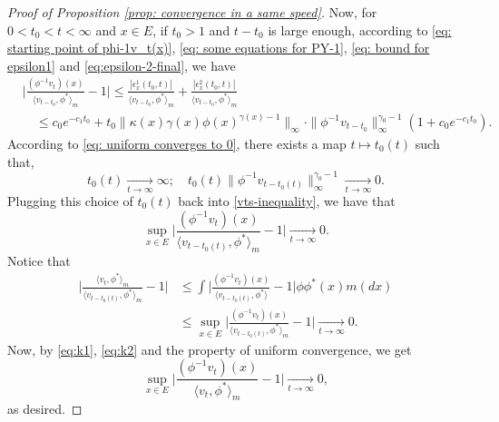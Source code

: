 \documentclass[12pt, a4paper]{amsart}
\theoremstyle{definition}
\numberwithin{equation}{section}
\begin{document}
\begin{proof}[Proof of Proposition \ref{prop: convergence in a same speed}]
Now, for
$0<t_0<t<\infty$ and $x\in E$, if $t_0 > 1$ and $t-t_0$ is large enough,
	according to \eqref{eq: starting point of phi-1v_t(x)}, \eqref{eq: some equations for PY-1}, \eqref{eq: bound for epsilon1} and \eqref{eq:epsilon-2-final}, we have
\[\label{vts-inequality}\begin{split}
	&\Big|\frac{(\phi^{-1}v_t)(x)}{\langle v_{t-t_0},\phi^* \rangle_m}-1 \Big|
	\leq \frac{|\epsilon_x^1(t_0,t)|}{\langle v_{t-t_0},\phi^* \rangle_m} + \frac{|\epsilon_x^2(t_0,t)|}{\langle v_{t-t_0},\phi^* \rangle_m}\\
	&\quad \leq c_0e^{-c_1 t_0} +t_0\|\kappa(x)\gamma(x)\phi(x)^{\gamma(x) - 1}\|_{\infty}
	\cdot \|\phi^{-1}v_{t-t_0}\|^{\gamma_0-1}_\infty (1+c_0 e^{-c_1 t_0}).
\end{split}\]
	According to \eqref{eq: uniform converges to 0},
	there exists a map $t\mapsto t_0(t)$ such that,
\[
	t_0(t)
	\xrightarrow[t\to\infty]{} \infty;
	\quad t_0(t)\| \phi^{-1}v_{t-t_0(t)}\|^{\gamma_0 - 1}_\infty
	\xrightarrow[t\to\infty]{} 0.
\]
	Plugging this choice of $t_0(t)$ back into \eqref{vts-inequality}, we have that
\[\label{eq:k1}
	\sup_{x\in E}\Big|\frac{(\phi^{-1}v_t)(x)}{\langle v_{t-t_0(t)},\phi^* \rangle_m}-1 \Big|
	\xrightarrow[t\to\infty]{} 0.
\]
	Notice that
\[\label{eq:k2}\begin{split}
	\Big |\frac {\langle v_t, \phi^*\rangle_m} {\langle v_{t-t_0(t)} , \phi^*\rangle_m} - 1 \Big |
	&\leq \int \Big | \frac{(\phi^{-1}v_t)(x)}{\langle v_{t-t_0(t)} , \phi^*\rangle} - 1 \Big| \phi \phi^*(x) m(dx)\\
	&\leq \sup_{x\in E}\Big|\frac{(\phi^{-1}v_t)(x)}{\langle v_{t-t_0(t)},\phi^* \rangle_m}-1 \Big|
	\xrightarrow[t\to\infty]{} 0.
\end{split}\]
	Now, by \eqref{eq:k1}, \eqref{eq:k2} and the property of uniform convergence, we get
\[
	\sup_{x\in E}\Big|\frac{(\phi^{-1}v_t)(x)}{\langle v_{t},\phi^* \rangle_m}-1 \Big|
	\xrightarrow[t\to\infty]{} 0,
\]
	as desired.
\end{proof}
\end{document}
